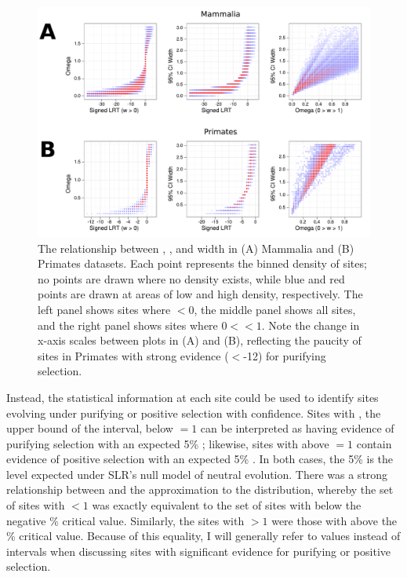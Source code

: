 \begin{figure}
\centering
\includegraphics[scale=0.65]{Figs/sites_scatters.pdf}
\caption{The relationship between \slrt, \omgml, and \ci width in (A)
  Mammalia and (B) Primates datasets. Each point represents the binned
  density of sites; no points are drawn where no density exists, while
  blue and red points are drawn at areas of low and high density,
  respectively. The left panel shows sites where \omgml$<0$, the
  middle panel shows all sites, and the right panel shows sites where
  $0<$\xspace\omgml$<1$. Note the change in x-axis scales between plots
  in (A) and (B), reflecting the paucity of sites in Primates with
  strong evidence (\slrt$<$-12) for purifying selection.}
\label{fig_sites_scatters}
\end{figure}

Instead, the statistical information at each site could be used to
identify sites evolving under purifying or positive selection with
confidence. Sites with \ciup, the upper bound of the \ci interval,
below \omg$=1$ can be interpreted as having evidence of purifying
selection with an expected 5\% \fpr; likewise, sites with \cidown
above \omg$=1$ contain evidence of positive selection with an expected
5\% \fpr. In both cases, the 5\% \fpr is the level expected under
SLR's null model of neutral evolution. There was a strong relationship
between \ciup and the \chisq approximation to the \slrt distribution,
whereby the set of sites with \ciup$<1$ was exactly equivalent to the
set of sites with \slrt below the negative \% critical
value. Similarly, the sites with \cidown$>1$ were those with \slrt
above the \% critical value. Because of this equality, I will
generally refer to \slrt values instead of \ci intervals when
discussing sites with significant evidence for purifying or positive
selection.

